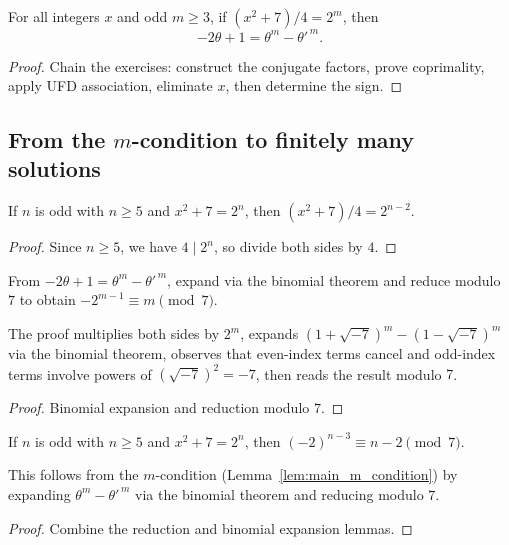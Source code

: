 \begin{lemma}
  \label{lem:main_m_condition}
  \leanok
  For all integers $x$ and odd $m \geq 3$, if $(x^2 + 7)/4 = 2^m$, then
  \[
    -2\theta + 1 = \theta^m - \theta'^{\,m}.
  \]
\end{lemma}
\begin{proof}\leanok
  Chain the exercises: construct the conjugate factors, prove coprimality,
  apply UFD association, eliminate $x$, then determine the sign.
\end{proof}

\subsection{From the $m$-condition to finitely many solutions}

\begin{lemma}
  \label{lem:reduction_divide_by_4}
  \leanok
  If $n$ is odd with $n \geq 5$ and $x^2 + 7 = 2^n$, then $(x^2 + 7)/4 = 2^{n-2}$.
\end{lemma}
\begin{proof}\leanok
  Since $n \geq 5$, we have $4 \mid 2^n$, so divide both sides by $4$.
\end{proof}

\begin{lemma}
  \label{lem:expand_by_binomial}
  \leanok
  From $-2\theta + 1 = \theta^m - \theta'^{\,m}$, expand via the binomial theorem
  and reduce modulo $7$ to obtain $-2^{m-1} \equiv m \pmod{7}$.

  The proof multiplies both sides by $2^m$, expands $(1 + \sqrt{-7})^m - (1 - \sqrt{-7})^m$
  via the binomial theorem, observes that even-index terms cancel and odd-index terms
  involve powers of $(\sqrt{-7})^2 = -7$, then reads the result modulo $7$.
\end{lemma}
\begin{proof}\leanok
  Binomial expansion and reduction modulo $7$.
\end{proof}

\begin{lemma}
  \label{lem:odd_case_mod_seven_constraint}
  \leanok
  If $n$ is odd with $n \geq 5$ and $x^2 + 7 = 2^n$, then
  $(-2)^{n-3} \equiv n - 2 \pmod{7}$.

  This follows from the $m$-condition (Lemma~\ref{lem:main_m_condition}) by expanding
  $\theta^m - \theta'^{\,m}$ via the binomial theorem and reducing modulo $7$.
\end{lemma}
\begin{proof}\leanok
  Combine the reduction and binomial expansion lemmas.
\end{proof}


